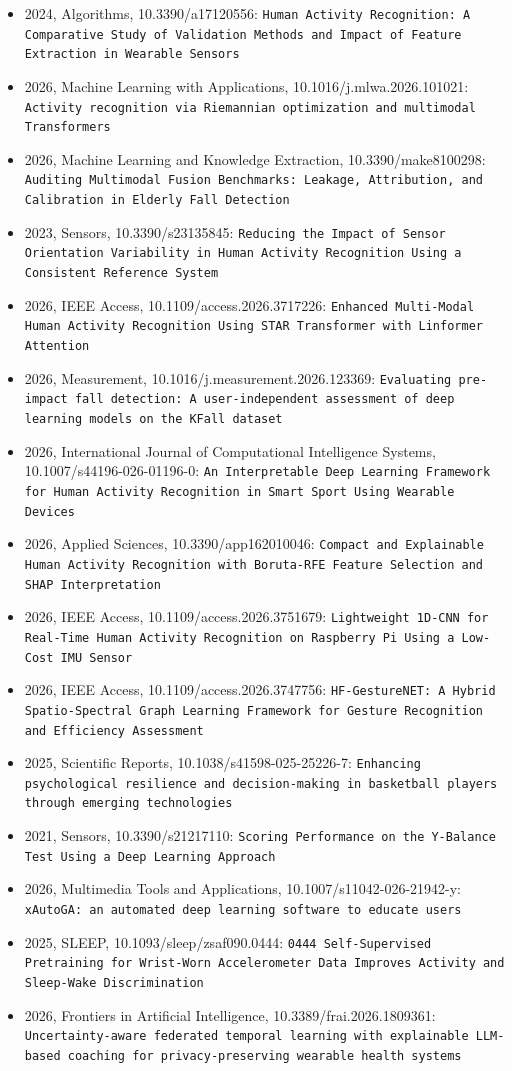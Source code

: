 \begin{itemize}
\item 2024, Algorithms, 10.3390/a17120556: \texttt{Human Activity Recognition: A Comparative Study of Validation Methods and Impact of Feature Extraction in Wearable Sensors}
\item 2026, Machine Learning with Applications, 10.1016/j.mlwa.2026.101021: \texttt{Activity recognition via Riemannian optimization and multimodal Transformers}
\item 2026, Machine Learning and Knowledge Extraction, 10.3390/make8100298: \texttt{Auditing Multimodal Fusion Benchmarks: Leakage, Attribution, and Calibration in Elderly Fall Detection}
\item 2023, Sensors, 10.3390/s23135845: \texttt{Reducing the Impact of Sensor Orientation Variability in Human Activity Recognition Using a Consistent Reference System}
\item 2026, IEEE Access, 10.1109/access.2026.3717226: \texttt{Enhanced Multi-Modal Human Activity Recognition Using STAR Transformer with Linformer Attention}
\item 2026, Measurement, 10.1016/j.measurement.2026.123369: \texttt{Evaluating pre-impact fall detection: A user-independent assessment of deep learning models on the KFall dataset}
\item 2026, International Journal of Computational Intelligence Systems, 10.1007/s44196-026-01196-0: \texttt{An Interpretable Deep Learning Framework for Human Activity Recognition in Smart Sport Using Wearable Devices}
\item 2026, Applied Sciences, 10.3390/app162010046: \texttt{Compact and Explainable Human Activity Recognition with Boruta-RFE Feature Selection and SHAP Interpretation}
\item 2026, IEEE Access, 10.1109/access.2026.3751679: \texttt{Lightweight 1D-CNN for Real-Time Human Activity Recognition on Raspberry Pi Using a Low-Cost IMU Sensor}
\item 2026, IEEE Access, 10.1109/access.2026.3747756: \texttt{HF-GestureNET: A Hybrid Spatio-Spectral Graph Learning Framework for Gesture Recognition and Efficiency Assessment}
\item 2025, Scientific Reports, 10.1038/s41598-025-25226-7: \texttt{Enhancing psychological resilience and decision-making in basketball players through emerging technologies}
\item 2021, Sensors, 10.3390/s21217110: \texttt{Scoring Performance on the Y-Balance Test Using a Deep Learning Approach}
\item 2026, Multimedia Tools and Applications, 10.1007/s11042-026-21942-y: \texttt{xAutoGA: an automated deep learning software to educate users}
\item 2025, SLEEP, 10.1093/sleep/zsaf090.0444: \texttt{0444 Self-Supervised Pretraining for Wrist-Worn Accelerometer Data Improves Activity and Sleep-Wake Discrimination}
\item 2026, Frontiers in Artificial Intelligence, 10.3389/frai.2026.1809361: \texttt{Uncertainty-aware federated temporal learning with explainable LLM-based coaching for privacy-preserving wearable health systems}
\end{itemize}

